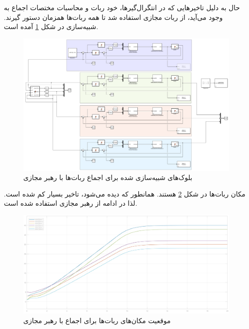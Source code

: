 حال به دلیل تاخیرهایی که در انتگرال‌گیرها، خود ربات و محاسبات مختصات اجماع به وجود می‌آید، از ربات مجازی استفاده شد تا همه ربات‌ها همزمان دستور گیرند. شبیه‌سازی در شکل \ref{Fig platoon-virtual-simulink} آمده است.
\begin{figure}[!h] 
	\centering
	\includegraphics[scale=0.25]{Images/platoon-virtual-simulink.png}
	\caption{بلوک‌های شبیه‌سازی شده برای اجماع ربات‌ها با رهبر مجازی} \label{Fig platoon-virtual-simulink}
\end{figure}

مکان ربات‌ها در شکل \ref{Fig platoon-virtual-pos} هستند. همانطور که دیده می‌شود، تاخیر بسیار کم شده است. لذا در ادامه از رهبر مجازی استفاده شده است.
\begin{figure}[!h] 
	\centering
	\includegraphics[scale=0.12]{Images/platoon-virtual-pos.jpg}
	\caption{موقعیت مکان‌های ربات‌ها برای اجماع با رهبر مجازی} \label{Fig platoon-virtual-pos}
\end{figure}







